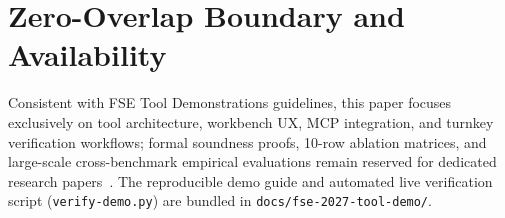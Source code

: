\documentclass[sigconf,nonacm]{acmart}
\begin{document}
\section{Zero-Overlap Boundary and Availability}
Consistent with FSE Tool Demonstrations guidelines, this paper focuses exclusively on tool architecture, workbench UX, MCP integration, and turnkey verification workflows; formal soundness proofs, 10-row ablation matrices, and large-scale cross-benchmark empirical evaluations remain reserved for dedicated research papers~\cite{jackee2020,jasmine2022,mecheck2025,sundermann2026pbddnnf,micans2025,schneider2025microsar}. The reproducible demo guide and automated live verification script (\texttt{verify-demo.py}) are bundled in \texttt{docs/fse-2027-tool-demo/}.



\end{document}
